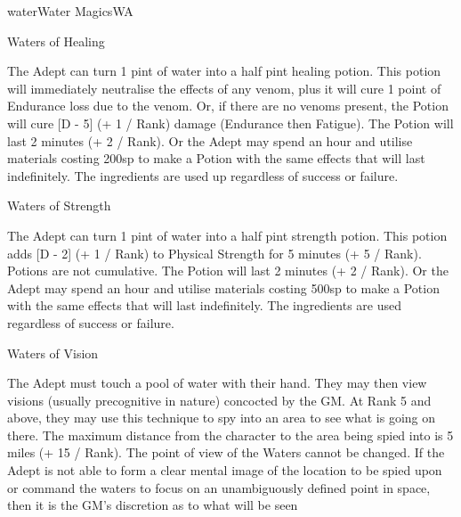 \begin{College}[1.3]{water}{Water Magics}{WA}
\begin{spell}[S-11]{Waters of Healing}

\begin{effects}
The Adept can turn 1 pint of water into a half pint healing potion.
This potion will immediately neutralise the effects of any venom, plus
it will cure 1 point of Endurance loss due to the venom.  Or, if there
are no venoms present, the Potion will cure [D - 5] (+ 1 / Rank)
damage (Endurance then Fatigue).  The Potion will last 2 minutes (+ 2
/ Rank). Or the Adept may spend an hour and utilise materials costing
200sp to make a Potion with the same effects that will last
indefinitely.  The ingredients are used up regardless of success or
failure.
\end{effects}
\end{spell}

\begin{spell}[S-12]{Waters of Strength}

\begin{effects}
The Adept can turn 1 pint of water into a half pint strength potion.
This potion adds [D - 2] (+ 1 / Rank) to Physical Strength for 5
minutes (+ 5 / Rank).  Potions are not cumulative.  The Potion will
last 2 minutes (+ 2 / Rank). Or the Adept may spend an hour and
utilise materials costing 500sp to make a Potion with the same effects
that will last indefinitely. The ingredients are used regardless of
success or failure.
\end{effects}
\end{spell}

\begin{spell}[S-13]{Waters of Vision}

\begin{effects}
The Adept must touch a pool of water with their hand.  They may then
view visions (usually precognitive in nature) concocted by the GM.  At
Rank 5 and above, they may use this technique to spy into an area to
see what is going on there. The maximum distance from the character to
the area being spied into is 5 miles (+ 15 / Rank). The point of view
of the Waters cannot be changed.  If the Adept is not able to form a
clear mental image of the location to be spied upon or command the
waters to focus on an unambiguously defined point in space, then it is
the GM’s discretion as to what will be seen
\end{effects}
\end{spell}


\end{College}
